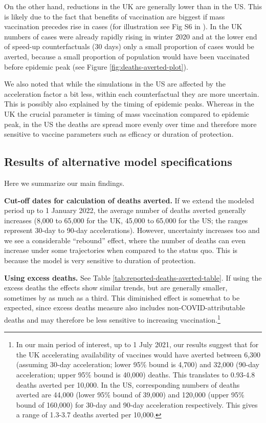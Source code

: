 \documentclass{article}
\begin{document}
On the other hand, reductions in the UK are generally lower than in the US. This is likely due to the fact that benefits of vaccination are biggest if mass vaccination precedes rise in cases (for illustration see Fig S6 in \citet{Wiecek2022Testing}). In the UK numbers of cases were already rapidly rising in winter 2020 and at the lower end of speed-up counterfactuals (30 days) only a small proportion of cases would be averted, because a small proportion of population would have been vaccinated before epidemic peak (see Figure \ref{fig:deaths-averted-plot}).

We also noted that while the simulations in the US are affected by the acceleration factor a bit less, within each counterfactual they are more uncertain. This is possibly also explained by the timing of epidemic peaks. Whereas in the UK the crucial parameter is timing of mass vaccination compared to epidemic peak, in the US the deaths are spread more evenly over time and therefore more sensitive to vaccine parameters such as efficacy or duration of protection.

\subsection{Results of alternative model specifications}\label{results-of-alternative-model-specifications}

Here we summarize our main findings.

\textbf{Cut-off dates for calculation of deaths averted.} If we extend the modeled period up to 1 January 2022, the average number of deaths averted generally increases (8,000 to 65,000 for the UK, 45,000 to 65,000 for the US; the ranges represent 30-day to 90-day accelerations). However, uncertainty increases too and we see a considerable ``rebound'' effect, where the number of deaths can even increase under some trajectories when compared to the status quo. This is because the model is very sensitive to duration of protection.

\textbf{Using excess deaths.} See Table \ref{tab:reported-deaths-averted-table}. If using the excess deaths the effects show similar trends, but are generally smaller, sometimes by as much as a third. This diminished effect is somewhat to be expected, since excess deaths measure also includes non-COVID-attributable deaths and may therefore be less sensitive to increasing vaccination.\footnote{In our main period of interest, up to 1 July 2021, our results suggest that for the UK accelerating availability of vaccines would have averted between 6,300 (assuming 30-day acceleration; lower 95\% bound is 4,700) and 32,000 (90-day acceleration; upper 95\% bound is 40,000) deaths. This translates to 0.93-4.8 deaths averted per 10,000. In the US, corresponding numbers of deaths averted are 44,000 (lower 95\% bound of 39,000) and 120,000 (upper 95\% bound of 160,000) for 30-day and 90-day acceleration respectively. This gives a range of 1.3-3.7 deaths averted per 10,000.}
\end{document}
